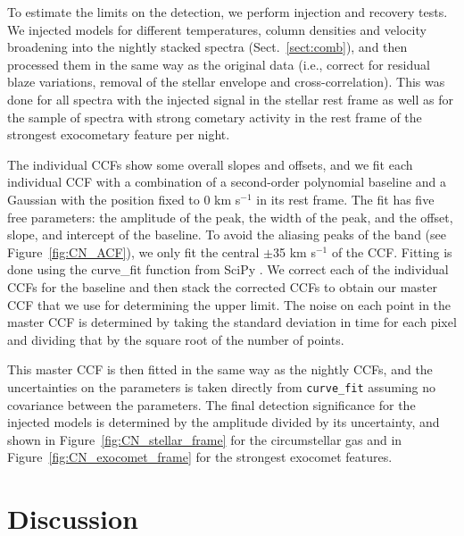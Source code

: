 \documentclass{aa}
\newcommand{\kms}{km s$^{-1}$}
\begin{document}
To estimate the limits on the  detection, we perform injection and recovery tests.
%
We injected models for different temperatures, column densities and velocity broadening into the nightly stacked spectra (Sect.~\ref{sect:comb}), and then processed them in the same way as the original data (i.e., correct for residual blaze variations, removal of the stellar envelope and cross-correlation).
%
This was done for all spectra with the injected signal in the stellar rest frame as well as for the sample of spectra with strong cometary activity in the rest frame of the strongest exocometary feature per night.

The individual CCFs show some overall slopes and offsets, and we fit each individual CCF with a combination of a second-order polynomial baseline and a Gaussian with the position fixed to 0 \kms{} in its rest frame.
%
The fit has five free parameters: the amplitude of the peak, the width of the peak, and the offset, slope, and intercept of the baseline.
%
To avoid the aliasing peaks of the  band (see Figure~\ref{fig:CN_ACF}), we only fit the central $\pm$35 \kms{} of the CCF.
%
Fitting is done using the curve\_fit function from SciPy \citep{2020SciPy-NMeth}.
%
We correct each of the individual CCFs for the baseline and then stack the corrected CCFs to obtain our master CCF that we use for determining the upper limit.
%
The noise on each point in the master CCF is determined by taking the standard deviation in time for each pixel and dividing that by the square root of the number of points.

This master CCF is then fitted in the same way as the nightly CCFs, and the uncertainties on the parameters is taken directly from {\tt curve\_fit} assuming no covariance between the parameters.
%
The final detection significance for the injected models is determined by the amplitude divided by its uncertainty, and shown in Figure~\ref{fig:CN_stellar_frame} for the circumstellar gas and in Figure~\ref{fig:CN_exocomet_frame} for the strongest exocomet features.

\section{Discussion}\label{sec:discuss}

\end{document}
